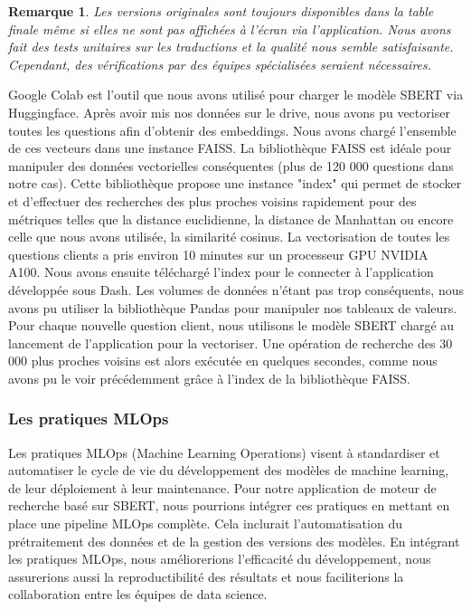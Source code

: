 \documentclass[12pt]{article}
\newtheorem{rmq}{Remarque}
\theoremstyle{definition}
\begin{document}
\begin{rmq}
	 Les versions originales sont toujours disponibles dans la table finale même si elles ne sont pas affichées à l’écran via l’application. Nous avons fait des tests unitaires sur les traductions et la qualité nous semble satisfaisante. Cependant, des vérifications par des équipes spécialisées seraient nécessaires.
\end{rmq}

Google Colab est l’outil que nous avons utilisé pour charger le modèle SBERT via Huggingface. Après avoir mis nos données sur le drive, nous avons pu vectoriser toutes les questions afin d'obtenir des embeddings. Nous avons chargé l’ensemble de ces vecteurs dans une instance FAISS. La bibliothèque FAISS est idéale pour manipuler des données vectorielles conséquentes (plus de 120 000 questions dans notre cas). Cette bibliothèque propose une instance "index" qui permet de stocker et d’effectuer des recherches des plus proches voisins rapidement pour des métriques telles que la distance euclidienne, la distance de Manhattan ou encore celle que nous avons utilisée, la similarité cosinus. La vectorisation de toutes les questions clients a pris environ 10 minutes sur un processeur GPU NVIDIA A100. Nous avons ensuite téléchargé l'index pour le connecter à l’application développée sous Dash. Les volumes de données n’étant pas trop conséquents, nous avons pu utiliser la bibliothèque Pandas pour manipuler nos tableaux de valeurs. Pour chaque nouvelle question client, nous utilisons le modèle SBERT chargé au lancement de l’application pour la vectoriser. Une opération de recherche des 30 000 plus proches voisins est alors exécutée en quelques secondes, comme nous avons pu le voir précédemment grâce à l’index de la bibliothèque FAISS.

\subsubsection{Les pratiques MLOps }

Les pratiques MLOps (Machine Learning Operations) visent à standardiser et automatiser le cycle de vie du développement des modèles de machine learning, de leur déploiement à leur maintenance. Pour notre application de moteur de recherche basé sur SBERT, nous pourrions intégrer ces pratiques en mettant en place une pipeline MLOps complète. Cela inclurait l'automatisation du prétraitement des données et de la gestion des versions des modèles. En intégrant les pratiques MLOps, nous améliorerions l'efficacité du développement, nous assurerions aussi la reproductibilité des résultats et nous faciliterions la collaboration entre les équipes de data science.
\end{document}

